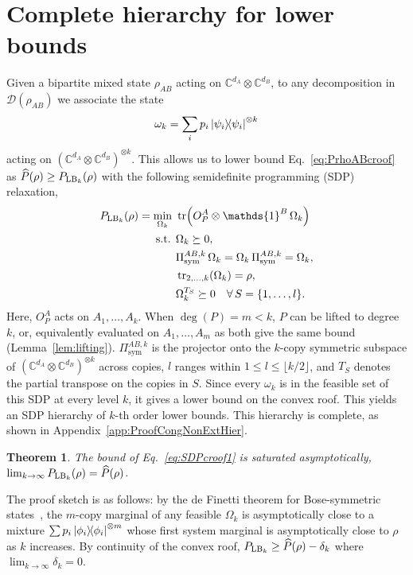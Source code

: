 \documentclass[aps,pra,twocolumn,showpacs,superscriptaddress,groupedaddress]{revtex4-2}
\newcommand{\one}[0]{\mathds{1}}
\newcommand{\C}{\mathds{C}}
\newcommand{\I}{\one}
\newtheorem{theorem}    {Theorem}
\begin{document}
\section{Complete hierarchy for lower bounds}
Given a bipartite mixed state $\rho_{AB}$ acting on $\C^{d_A} \otimes \C^{d_B}$, to any decomposition in $\mathcal{D}(\rho_{AB})$ we associate the state~\cite{Toth2015CroofTP}
\begin{equation}\label{eq:omega}
    \omega_k = \sum_i p_i \dyad{\psi_i}^{\otimes k}
\end{equation}
acting on $(\C^{d_A} \otimes \C^{d_B})^{\otimes k}$.
This allows us to lower bound Eq.~\eqref{eq:PrhoABcroof} as $\widehat{P}(\rho)\geq P_{{\rm LB}_k}(\rho)$ with the following semidefinite programming (SDP) relaxation,
\begin{align}
    P_{{\rm LB}_k}(\rho)=\min_{\Omega_k} \ &\tr\!\left(O_P^A \otimes \I^B \, \Omega_k\right)\label{eq:SDPcroof1}\\
    \text{s.t. } & \Omega_k \succeq 0, \nonumber\\
    & \Pi_\text{sym}^{AB,k} \, \Omega_k = \Omega_k\,\Pi_\text{sym}^{AB,k}  = \Omega_k,\nonumber\\
    & \tr_{2,\dots,k} (\Omega_k) = \rho, \nonumber\\
    & \Omega_k^{T_S} \succeq 0 \quad  \forall \, S = \{1, \dots, l\}.\nonumber
\end{align}
Here, $O_P^A$ acts on $A_1,\dots,A_k$. When $\deg(P) = m < k$, $P$ can be lifted to degree $k$, or, equivalently evaluated on $A_1,\dots,A_m$ as both give the same bound (Lemma~\ref{lem:lifting}). $\Pi_\text{sym}^{AB,k}$ is the projector onto the $k$-copy symmetric subspace of $(\C^{d_A}\otimes\C^{d_B})^{\otimes k}$ across copies, $l$ ranges within $1 \leq l \leq \lfloor k/2 \rfloor$, and $T_S$ denotes the partial transpose on the copies in $S$. Since every $\omega_k$ is in the feasible set of this SDP at every level $k$, it gives a lower bound on the convex roof. This yields an SDP hierarchy of $k$-th order lower bounds. This hierarchy is complete, as shown in Appendix~\ref{app:ProofCongNonExtHier}.
\begin{theorem}\label{thm:ConvergenceSDPcroof}
The bound of Eq.~\eqref{eq:SDPcroof1} is saturated asymptotically, $\lim_{k\rightarrow\infty} P_{{\rm LB}_k}(\rho) = \widehat{P}(\rho)$.
\end{theorem}
The proof sketch is as follows: by the de Finetti theorem for Bose-symmetric states~\cite{caves2002unknown}, the $m$-copy marginal of any feasible $\Omega_k$ is asymptotically close to a mixture $\sum p_i \dyad{\phi_i}^{\otimes m}$ whose first system marginal is asymptotically close to $\rho$ as $k$ increases. By continuity of the convex roof, $P_{{\rm LB}_k} \geq \widehat{P}(\rho) - \delta_k$ where $\lim_{k\to \infty}\delta_k=0$.
\end{document}
